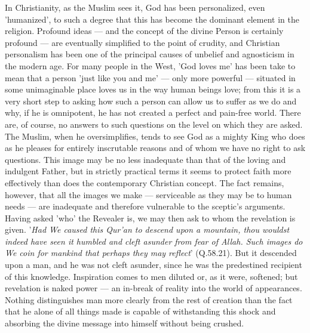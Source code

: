 \documentclass[10pt, twoside]{book}
\begin{document}
In Christianity, as the Muslim sees it, God has been personalized, even 'humanized', to such a degree 
that this has become the dominant element in the religion. Profound ideas --- and the concept of the 
divine Person is certainly profound --- are eventually simplified to the point of crudity, and 
Christian personalism has been one of the principal causes of unbelief and agnosticism in the modern 
age. For many people in the West, 'God loves me' has been take to mean that a person 'just like you 
and me' --- only more powerful --- situated in some unimaginable place loves us in the way human beings 
love; from this it is a very short step to asking how such a person can allow us to suffer as we do 
and why, if he is omnipotent, he has not created a perfect and pain\hyp{}free world. There are, of course, 
no answers to such questions on the level on which they are asked. \\

The Muslim, when he oversimplifies, tends to see God as a mighty King who does as he pleases for 
entirely inscrutable reasons and of whom we have no right to ask questions. This image may be no less 				
inadequate than that of the loving and indulgent Father, but in strictly practical terms it seems to 
protect faith more effectively than does the contemporary Christian concept. The fact remains, 
however, that all the images we make --- serviceable as they may be to human needs --- are inadequate and therefore vulnerable to the sceptic's arguments. \\

Having asked 'who' the Revealer is, we may then ask to whom the revelation is given. '\emph{Had We caused this Qur'an to descend upon a mountain, thou wouldst indeed have seen it humbled and cleft asunder from fear of Allah. Such images do We coin for mankind that perhaps they may reflect}' (Q.58.21). But it descended upon a man, and he was not cleft asunder, since he was the predestined recipient of this knowledge. Inspiration comes to men diluted or, as it were, softened; but revelation is naked power --- an in\hyp{}break of reality into the world of appearances. Nothing distinguishes man more clearly from the rest of creation than the fact that he alone of all things made is capable of withstanding this shock and absorbing the divine message into himself without being crushed. \\
\end{document}
